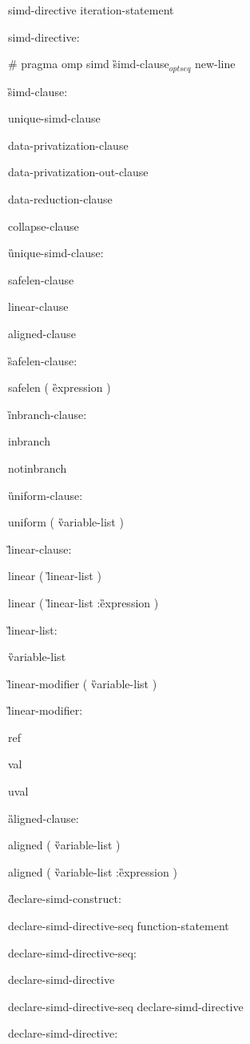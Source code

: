 {\I simd-directive iteration-statement

simd-directive:

\C\I \# pragma omp simd \G simd-clause$_{optseq}$ new-line

\G simd-clause:

\I unique-simd-clause

\I data-privatization-clause

\I data-privatization-out-clause

\I data-reduction-clause

\I collapse-clause

\G unique-simd-clause:

\I safelen-clause

\I linear-clause

\I aligned-clause

\G safelen-clause:

\C\I safelen ( \G expression \C )

\G inbranch-clause:

\C\I inbranch

\I notinbranch

\G uniform-clause:

\C\I uniform ( \G variable-list \C )

\G linear-clause:

\C\I linear ( \G linear-list \C )

\C\I linear ( \G linear-list \C :\G expression \C )

\G linear-list:

\C\I\G variable-list

\C\I\G linear-modifier \C ( \G variable-list \C )

\G linear-modifier:

\C\I ref

\C\I val

\C\I uval

\G aligned-clause:

\C\I aligned ( \G variable-list \C )

\I aligned ( \G variable-list \C :\G expression \C )

\G declare-simd-construct:

\I declare-simd-directive-seq function-statement

declare-simd-directive-seq:

\I declare-simd-directive

\I declare-simd-directive-seq declare-simd-directive

declare-simd-directive:

}
